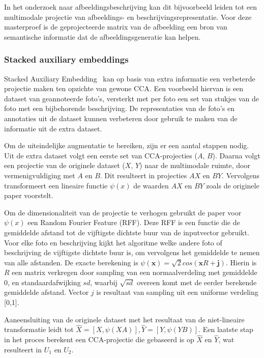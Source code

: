 In het onderzoek naar afbeeldingsbeschrijving kan dit bijvoorbeeld leiden tot een multimodale projectie van afbeeldings- en beschrijvingsrepresentatie. Voor deze masterproef is de geprojecteerde matrix van de afbeelding een bron van semantische informatie dat de afbeeldingsgeneratie kan helpen.

\subsubsection{Stacked auxiliary embeddings}
\label{sub:stackedcca}  
Stacked Auxiliary Embedding~\cite{Gong2014} kan op basis van extra informatie een verbeterde projectie maken ten opzichte van gewone CCA. Een voorbeeld hiervan is een dataset van geannoteerde foto's, versterkt met per foto een set van stukjes van de foto met een bijbehorende beschrijving. De representaties van de foto's en annotaties uit de dataset kunnen verbeteren door gebruik te maken van de informatie uit de extra dataset.

Om de uiteindelijke augmentatie te bereiken, zijn er een aantal stappen nodig. Uit de extra dataset volgt een eerste set van CCA-projecties ($A$, $B$). Daarna volgt een projectie van de originele dataset ($X$, $Y$) naar de multimodale ruimte, door vermenigvuldiging met $A$ en $B$. Dit resulteert in projecties $AX$ en $BY$. Vervolgens transformeert een lineaire functie $\psi(x)$ de waarden $AX$ en $BY$ zoals de originele paper voorstelt.

Om de dimensionaliteit van de projectie te verhogen gebruikt de paper voor $\psi(x)$ een Random Fourier Feature (RFF). Deze RFF is een functie die de gemiddelde afstand tot de vijftigste dichtste buur van de inputvector gebruikt. Voor elke foto en beschrijving kijkt het algoritme welke andere foto of beschrijving de vijftigste dichtste buur is, om vervolgens het gemiddelde te nemen van alle afstanden. De exacte berekening is $\psi(\mathbf{x})=\sqrt{2}cos(\mathbf{x}R+\mathbf{j})$. Hierin is $R$ een matrix verkregen door sampling van een normaalverdeling met gemiddelde 0, en standaardafwijking $sd$, waarbij $\sqrt{sd}$ overeen komt met de eerder berekende gemiddelde afstand. Vector $j$ is resultaat van sampling uit een uniforme verdeling [0,1].

Aaneensluiting van de originele dataset met het resultaat van de niet-lineaire transformatie leidt tot $\hat{X} = [X, \psi(XA)], \hat{Y} = [Y, \psi(YB)]$. Een laatste stap in het proces berekent een CCA-projectie die gebaseerd is op $\hat{X}$ en $\hat{Y}$, wat resulteert in $U_1$ en $U_2$.

